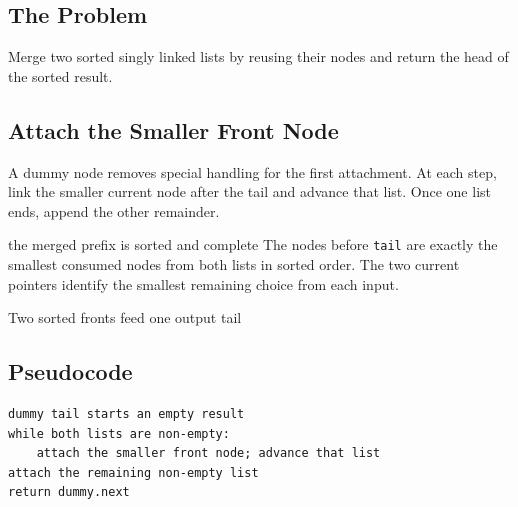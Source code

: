 \subsection{The Problem}
Merge two sorted singly linked lists by reusing their nodes and return the
head of the sorted result.

\subsection{Attach the Smaller Front Node}
A dummy node removes special handling for the first attachment. At each step,
link the smaller current node after the tail and advance that list. Once one
list ends, append the other remainder.

\begin{invariantbox}{the merged prefix is sorted and complete}
The nodes before \texttt{tail} are exactly the smallest consumed nodes from
both lists in sorted order. The two current pointers identify the smallest
remaining choice from each input.
\end{invariantbox}

\begin{visualbox}{Two sorted fronts feed one output tail}
\centering
{}
\end{visualbox}

\subsection{Pseudocode}
\begin{lstlisting}[style=pseudocode]
dummy tail starts an empty result
while both lists are non-empty:
    attach the smaller front node; advance that list
attach the remaining non-empty list
return dummy.next
\end{lstlisting}

